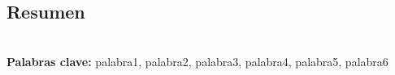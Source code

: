 \thispagestyle{plain}
\vspace*{1em}
\begin{center}
    \section*{Resumen}
\end{center}
\vspace*{1em}
\vspace*{1em}

\lipsum[2]\\
\vspace{0.5cm}
\textbf{Palabras clave:} palabra1, palabra2, palabra3, palabra4, palabra5, palabra6